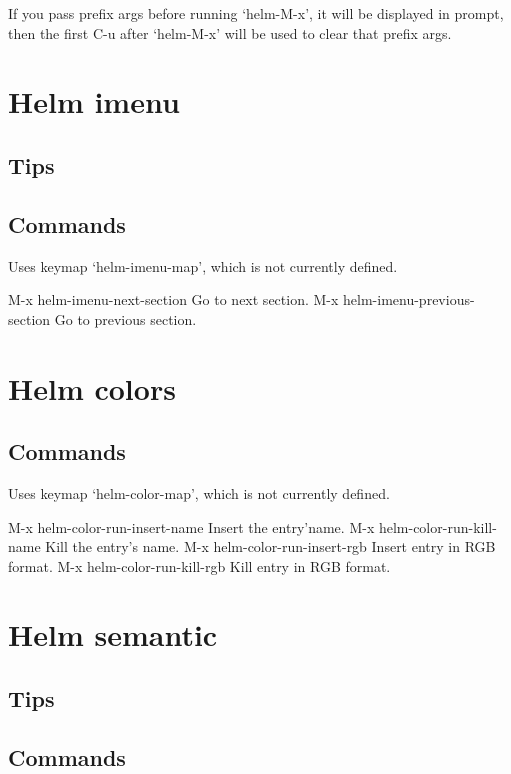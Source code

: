 \documentclass[11pt]{article}
\begin{document}
If you pass prefix args before running ‘helm-M-x’, it will be displayed in prompt,
then the first C-u after ‘helm-M-x’ will be used to clear that prefix args.

\section{Helm imenu}
\label{sec:org21a0b10}

\subsection{Tips}
\label{sec:orgd0f749c}

\subsection{Commands}
\label{sec:orgaeb8994}

Uses keymap ‘helm-imenu-map’, which is not currently defined.

M-x helm-imenu-next-section		Go to next section.
M-x helm-imenu-previous-section		Go to previous section.

\section{Helm colors}
\label{sec:orgb603168}

\subsection{Commands}
\label{sec:org907dc33}

Uses keymap ‘helm-color-map’, which is not currently defined.

M-x helm-color-run-insert-name		Insert the entry’name.
M-x helm-color-run-kill-name		Kill the entry’s name.
M-x helm-color-run-insert-rgb		Insert entry in RGB format.
M-x helm-color-run-kill-rgb		Kill entry in RGB format.

\section{Helm semantic}
\label{sec:org32acb58}

\subsection{Tips}
\label{sec:org63322a4}

\subsection{Commands}
\label{sec:orgd9a1e0b}
\end{document}
